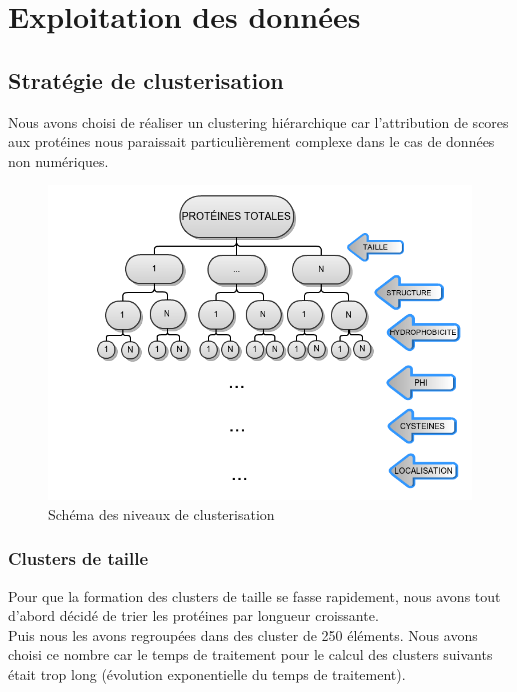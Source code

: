 \section*{Exploitation des données}


\subsection*{Stratégie de clusterisation}
Nous avons choisi de réaliser un clustering hiérarchique car l'attribution de scores aux protéines nous paraissait particulièrement complexe dans le cas de données non numériques. 

\begin{figure}
\includegraphics[scale=0.5]{Datamining.png}
\caption{Schéma des niveaux de clusterisation} 
\end{figure}

\subsubsection*{Clusters de taille}
Pour que la formation des clusters de taille se fasse rapidement, nous avons tout d'abord décidé de trier les protéines par longueur croissante. \\
Puis nous les avons regroupées dans des cluster de 250 éléments. Nous avons choisi ce nombre car le temps de traitement pour le calcul des clusters suivants était trop long (évolution exponentielle du temps de traitement).

